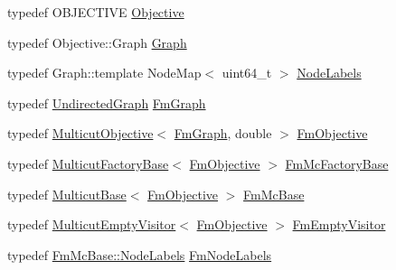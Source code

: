 \begin{DoxyCompactItemize}
\item 
typedef O\+B\+J\+E\+C\+T\+I\+V\+E \hyperlink{classnifty_1_1graph_1_1FusionMove_a1318f004b56344164b0845f7c826e9db}{Objective}
\item 
typedef Objective\+::\+Graph \hyperlink{classnifty_1_1graph_1_1FusionMove_a76f1d4cff7ee7c3f6033e23ffb761c55}{Graph}
\item 
typedef Graph\+::template Node\+Map$<$ uint64\+\_\+t $>$ \hyperlink{classnifty_1_1graph_1_1FusionMove_a09c0e32e02ed1d1d38722de4752f019f}{Node\+Labels}
\item 
typedef \hyperlink{classnifty_1_1graph_1_1UndirectedGraph}{Undirected\+Graph} \hyperlink{classnifty_1_1graph_1_1FusionMove_a9192ebd1542c7525e8b3f7416ec92f63}{Fm\+Graph}
\item 
typedef \hyperlink{classnifty_1_1graph_1_1MulticutObjective}{Multicut\+Objective}$<$ \hyperlink{classnifty_1_1graph_1_1FusionMove_a9192ebd1542c7525e8b3f7416ec92f63}{Fm\+Graph}, double $>$ \hyperlink{classnifty_1_1graph_1_1FusionMove_ad40d83951f141ac8b6fc949995916377}{Fm\+Objective}
\item 
typedef \hyperlink{classnifty_1_1graph_1_1MulticutFactoryBase}{Multicut\+Factory\+Base}$<$ \hyperlink{classnifty_1_1graph_1_1FusionMove_ad40d83951f141ac8b6fc949995916377}{Fm\+Objective} $>$ \hyperlink{classnifty_1_1graph_1_1FusionMove_a75c5190f6b01321efa3f23cb10b2dd36}{Fm\+Mc\+Factory\+Base}
\item 
typedef \hyperlink{classnifty_1_1graph_1_1MulticutBase}{Multicut\+Base}$<$ \hyperlink{classnifty_1_1graph_1_1FusionMove_ad40d83951f141ac8b6fc949995916377}{Fm\+Objective} $>$ \hyperlink{classnifty_1_1graph_1_1FusionMove_a2805f5230219c8c6118663ca5ec9d144}{Fm\+Mc\+Base}
\item 
typedef \hyperlink{namespacenifty_1_1graph_a37de21ae53be2952a5876727dadceed1}{Multicut\+Empty\+Visitor}$<$ \hyperlink{classnifty_1_1graph_1_1FusionMove_ad40d83951f141ac8b6fc949995916377}{Fm\+Objective} $>$ \hyperlink{classnifty_1_1graph_1_1FusionMove_aba3bcdc03f395f2eb0a4b2f4ea26c649}{Fm\+Empty\+Visitor}
\item 
typedef \hyperlink{classnifty_1_1graph_1_1MulticutBase_afba61ad2919d0fad20b3745af19309da}{Fm\+Mc\+Base\+::\+Node\+Labels} \hyperlink{classnifty_1_1graph_1_1FusionMove_a411fd2cd3e59b587e5399318882ee4be}{Fm\+Node\+Labels}
\end{DoxyCompactItemize}
